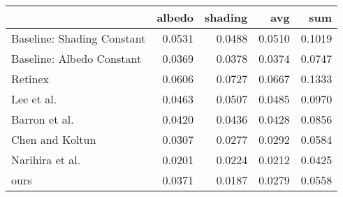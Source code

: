 \begin{tabular}{lrrrr}
\toprule
{} &  albedo &  shading &     avg &     sum \\
\midrule
Baseline: Shading Constant          &  0.0531 &   0.0488 &  0.0510 &  0.1019 \\
Baseline: Albedo Constant           &  0.0369 &   0.0378 &  0.0374 &  0.0747 \\
Retinex \cite{grosse2009}           &  0.0606 &   0.0727 &  0.0667 &  0.1333 \\
Lee et al. \cite{lee2012}           &  0.0463 &   0.0507 &  0.0485 &  0.0970 \\
Barron et al. \cite{barron2015}     &  0.0420 &   0.0436 &  0.0428 &  0.0856 \\
Chen and Koltun \cite{chen2013}     &  0.0307 &   0.0277 &  0.0292 &  0.0584 \\
Narihira et al. \cite{narihira2015} &  0.0201 &   0.0224 &  0.0212 &  0.0425 \\
ours                                &  0.0371 &   0.0187 &  0.0279 &  0.0558 \\
\bottomrule
\end{tabular}

